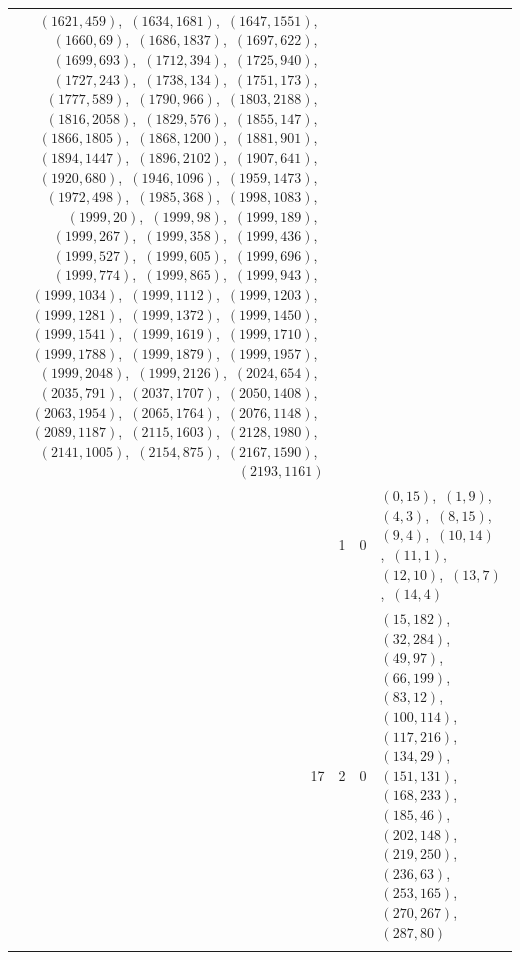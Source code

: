 \documentclass[11pt]{article}
\begin{document}
\begin{longtable}{@{}rrl>{\raggedright\arraybackslash}p{}@{}}
$(1621,459)$,\allowbreak\ $(1634,1681)$,\allowbreak\ $(1647,1551)$,\allowbreak\ $(1660,69)$,\allowbreak\ $(1686,1837)$,\allowbreak\ $(1697,622)$,\allowbreak\ $(1699,693)$,\allowbreak\ $(1712,394)$,\allowbreak\ $(1725,940)$,\allowbreak\ $(1727,243)$,\allowbreak\ $(1738,134)$,\allowbreak\ $(1751,173)$,\allowbreak\ $(1777,589)$,\allowbreak\ $(1790,966)$,\allowbreak\ $(1803,2188)$,\allowbreak\ $(1816,2058)$,\allowbreak\ $(1829,576)$,\allowbreak\ $(1855,147)$,\allowbreak\ $(1866,1805)$,\allowbreak\ $(1868,1200)$,\allowbreak\ $(1881,901)$,\allowbreak\ $(1894,1447)$,\allowbreak\ $(1896,2102)$,\allowbreak\ $(1907,641)$,\allowbreak\ $(1920,680)$,\allowbreak\ $(1946,1096)$,\allowbreak\ $(1959,1473)$,\allowbreak\ $(1972,498)$,\allowbreak\ $(1985,368)$,\allowbreak\ $(1998,1083)$,\allowbreak\ $(1999,20)$,\allowbreak\ $(1999,98)$,\allowbreak\ $(1999,189)$,\allowbreak\ $(1999,267)$,\allowbreak\ $(1999,358)$,\allowbreak\ $(1999,436)$,\allowbreak\ $(1999,527)$,\allowbreak\ $(1999,605)$,\allowbreak\ $(1999,696)$,\allowbreak\ $(1999,774)$,\allowbreak\ $(1999,865)$,\allowbreak\ $(1999,943)$,\allowbreak\ $(1999,1034)$,\allowbreak\ $(1999,1112)$,\allowbreak\ $(1999,1203)$,\allowbreak\ $(1999,1281)$,\allowbreak\ $(1999,1372)$,\allowbreak\ $(1999,1450)$,\allowbreak\ $(1999,1541)$,\allowbreak\ $(1999,1619)$,\allowbreak\ $(1999,1710)$,\allowbreak\ $(1999,1788)$,\allowbreak\ $(1999,1879)$,\allowbreak\ $(1999,1957)$,\allowbreak\ $(1999,2048)$,\allowbreak\ $(1999,2126)$,\allowbreak\ $(2024,654)$,\allowbreak\ $(2035,791)$,\allowbreak\ $(2037,1707)$,\allowbreak\ $(2050,1408)$,\allowbreak\ $(2063,1954)$,\allowbreak\ $(2065,1764)$,\allowbreak\ $(2076,1148)$,\allowbreak\ $(2089,1187)$,\allowbreak\ $(2115,1603)$,\allowbreak\ $(2128,1980)$,\allowbreak\ $(2141,1005)$,\allowbreak\ $(2154,875)$,\allowbreak\ $(2167,1590)$,\allowbreak\ $(2193,1161)$\\
\addlinespace[3pt]
17 & 1 & $0$ & $(0,15)$,\allowbreak\ $(1,9)$,\allowbreak\ $(4,3)$,\allowbreak\ $(8,15)$,\allowbreak\ $(9,4)$,\allowbreak\ $(10,14)$,\allowbreak\ $(11,1)$,\allowbreak\ $(12,10)$,\allowbreak\ $(13,7)$,\allowbreak\ $(14,4)$\\
17 & 2 & $0$ & $(15,182)$,\allowbreak\ $(32,284)$,\allowbreak\ $(49,97)$,\allowbreak\ $(66,199)$,\allowbreak\ $(83,12)$,\allowbreak\ $(100,114)$,\allowbreak\ $(117,216)$,\allowbreak\ $(134,29)$,\allowbreak\ $(151,131)$,\allowbreak\ $(168,233)$,\allowbreak\ $(185,46)$,\allowbreak\ $(202,148)$,\allowbreak\ $(219,250)$,\allowbreak\ $(236,63)$,\allowbreak\ $(253,165)$,\allowbreak\ $(270,267)$,\allowbreak\ $(287,80)$\\
\addlinespace[3pt]
\end{longtable}
\endgroup
\end{document}
